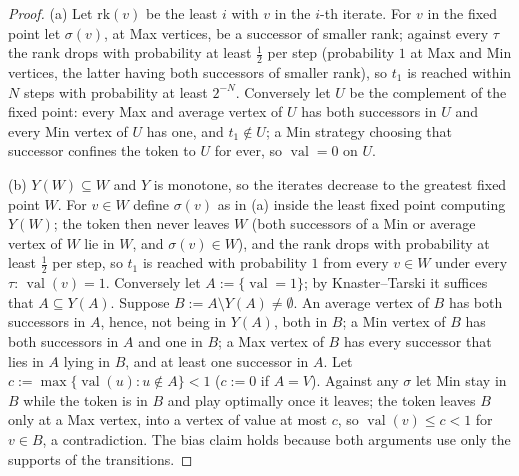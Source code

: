 \documentclass[11pt]{article}
\theoremstyle{plain}
\theoremstyle{definition}
\DeclareMathOperator{\val}{val}
\begin{document}
\begin{proof}
(a) Let $\mathrm{rk}(v)$ be the least $i$ with $v$ in the $i$-th iterate.
For $v$ in the fixed point let $\sigma(v)$, at Max vertices, be a
successor of smaller rank; against every $\tau$ the rank drops with
probability at least $\tfrac12$ per step (probability $1$ at Max and Min
vertices, the latter having both successors of smaller rank), so $t_1$ is
reached within $N$ steps with probability at least $2^{-N}$. Conversely
let $U$ be the complement of the fixed point: every Max and average
vertex of $U$ has both successors in $U$ and every Min vertex of $U$ has
one, and $t_1\notin U$; a Min strategy choosing that successor confines
the token to $U$ for ever, so $\val=0$ on $U$.

(b) $Y(W)\subseteq W$ and $Y$ is monotone, so the iterates decrease to
the greatest fixed point $W$. For $v\in W$ define $\sigma(v)$ as in (a)
inside the least fixed point computing $Y(W)$; the token then never leaves
$W$ (both successors of a Min or average vertex of $W$ lie in $W$, and
$\sigma(v)\in W$), and the rank drops with probability at least
$\tfrac12$ per step, so $t_1$ is reached with probability $1$ from every
$v\in W$ under every $\tau$: $\val(v)=1$. Conversely let
$A:=\{\val=1\}$; by Knaster--Tarski it suffices that $A\subseteq Y(A)$.
Suppose $B:=A\setminus Y(A)\neq\emptyset$. An average vertex of $B$ has
both successors in $A$, hence, not being in $Y(A)$, both in $B$; a Min
vertex of $B$ has both successors in $A$ and one in $B$; a Max vertex of
$B$ has every successor that lies in $A$ lying in $B$, and at least one
successor in $A$. Let $c:=\max\{\val(u):u\notin A\}<1$ ($c:=0$ if
$A=V$). Against any $\sigma$ let Min stay in $B$ while the token is in
$B$ and play optimally once it leaves; the token leaves $B$ only at a Max
vertex, into a vertex of value at most $c$, so $\val(v)\le c<1$ for
$v\in B$, a contradiction. The bias claim holds because both arguments
use only the supports of the transitions.
\end{proof}
\end{document}
